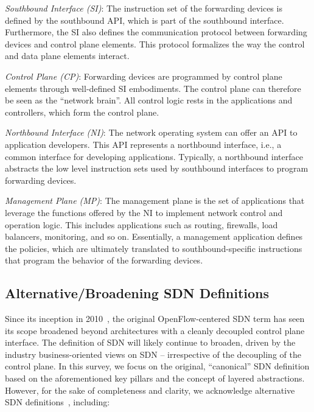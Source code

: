 \noindent \textit{Southbound Interface (SI)}: The instruction set of the forwarding devices is defined 
by the southbound API, which is part of the southbound interface. Furthermore, the SI also defines the 
communication protocol between forwarding devices and control plane elements. This protocol formalizes 
the way the control and data plane elements interact.

\noindent \textit{Control Plane (CP)}: Forwarding devices are programmed by control plane elements 
through well-defined SI embodiments. The control plane can therefore be seen as the ``network brain''.
All control logic rests in the applications and controllers, which form the control plane.

\noindent \textit{Northbound Interface (NI)}: The network operating system can offer an API to application 
developers. This API represents a northbound interface, i.e., a common interface for developing applications.
Typically, a northbound interface abstracts the low level instruction sets used by southbound interfaces 
to program forwarding devices.

\noindent \textit{Management Plane (MP)}: The management plane is the set of applications that leverage 
the functions offered by the NI to implement network control and operation logic.
This includes applications such as routing, firewalls, load balancers, monitoring, and so on.
Essentially, a management application defines the policies, which are ultimately translated to 
southbound-specific instructions that program the behavior of the forwarding devices.

\subsection{Alternative/Broadening SDN Definitions}
\label{sec:alt-SDN}


Since its inception in 2010~\cite{greene2009}, the original OpenFlow-centered SDN term 
has seen its scope broadened beyond architectures with a cleanly decoupled control plane 
interface. The definition of SDN will likely continue to broaden, driven by the industry 
business-oriented views on SDN -- irrespective of the decoupling of the control plane. In 
this survey, we focus on the original, ``canonical'' SDN definition based on the aforementioned
key pillars and the concept of layered abstractions. However, for the sake of completeness 
and clarity, we acknowledge alternative SDN definitions~\cite{nadeau2013}, including:

